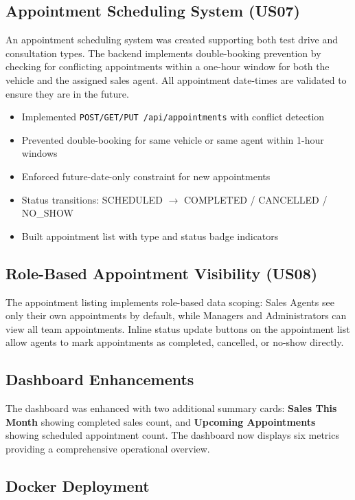 \documentclass[12pt,a4paper]{article}
\begin{document}
\subsection{Appointment Scheduling System (US07)}

An appointment scheduling system was created supporting both test drive and consultation types. The backend implements double-booking prevention by checking for conflicting appointments within a one-hour window for both the vehicle and the assigned sales agent. All appointment date-times are validated to ensure they are in the future.

\begin{itemize}[leftmargin=1.5em, itemsep=4pt]
  \item Implemented \texttt{POST/GET/PUT /api/appointments} with conflict detection
  \item Prevented double-booking for same vehicle or same agent within 1-hour windows
  \item Enforced future-date-only constraint for new appointments
  \item Status transitions: SCHEDULED $\rightarrow$ COMPLETED / CANCELLED / NO\_SHOW
  \item Built appointment list with type and status badge indicators
\end{itemize}

\subsection{Role-Based Appointment Visibility (US08)}

The appointment listing implements role-based data scoping: Sales Agents see only their own appointments by default, while Managers and Administrators can view all team appointments. Inline status update buttons on the appointment list allow agents to mark appointments as completed, cancelled, or no-show directly.

\subsection{Dashboard Enhancements}

The dashboard was enhanced with two additional summary cards: \textbf{Sales This Month} showing completed sales count, and \textbf{Upcoming Appointments} showing scheduled appointment count. The dashboard now displays six metrics providing a comprehensive operational overview.

\subsection{Docker Deployment}
\end{document}
